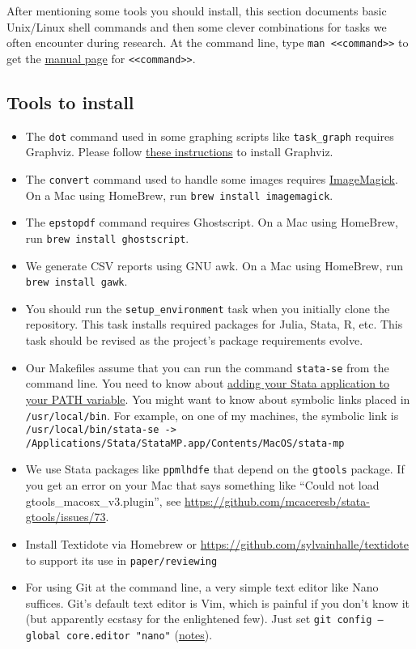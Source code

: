 \label{entry:unixshelltips}

After mentioning some tools you should install,
this section documents basic Unix/Linux shell commands and then some clever combinations for tasks we often encounter during research.
At the command line, type \texttt{man <<command>>} to get the \href{https://en.wikipedia.org/wiki/Man_page}{manual page} for \texttt{<<command>>}.

\subsection{Tools to install}
\begin{itemize}
\item
The \texttt{dot} command used in some graphing scripts like \texttt{task\_graph} requires Graphviz.
Please follow \href{https://graphviz.org/download/}{these instructions} to install Graphviz.
\item
The \texttt{convert} command used to handle some images requires \href{https://imagemagick.org/index.php}{ImageMagick}.
On a Mac using HomeBrew, run \texttt{brew install imagemagick}.
\item 
The \texttt{epstopdf} command requires Ghostscript.
On a Mac using HomeBrew, run \texttt{brew install ghostscript}.
\item 
We generate CSV reports using GNU awk.
On a Mac using HomeBrew, run \texttt{brew install gawk}.
\item
You should run the \texttt{setup\_environment} task when you initially clone the repository.
This task installs required packages for Julia, Stata, R, etc.
This task should be revised as the project's package requirements evolve.
\item
Our Makefiles assume that you can run the command \texttt{stata-se} from the command line. 
You need to know about \href{https://www.stata.com/support/faqs/mac/advanced-topics/}{adding your Stata application to your PATH variable}.
You might want to know about symbolic links placed in \texttt{/usr/local/bin}.
For example, on one of my machines, the symbolic link is
\texttt{/usr/local/bin/stata-se -> /Applications/Stata/StataMP.app/Contents/MacOS/stata-mp}
\item
We use Stata packages like \texttt{ppmlhdfe} that depend on the \texttt{gtools} package.
If you get an error on your Mac that says something like ``Could not load gtools\_macosx\_v3.plugin'',
see \url{https://github.com/mcaceresb/stata-gtools/issues/73}.
\item
Install Textidote via Homebrew or \url{https://github.com/sylvainhalle/textidote} to support its use in \texttt{paper/reviewing}
\item
For using Git at the command line, a very simple text editor like Nano suffices.
Git's default text editor is Vim, which is painful if you don't know it (but apparently ecstasy for the enlightened few).
Just set \texttt{git config --global core.editor "nano"}
(\href{https://www.macinstruct.com/tutorials/how-to-set-nano-as-the-default-editor-for-git-on-your-mac/}{notes}).
\end{itemize}

